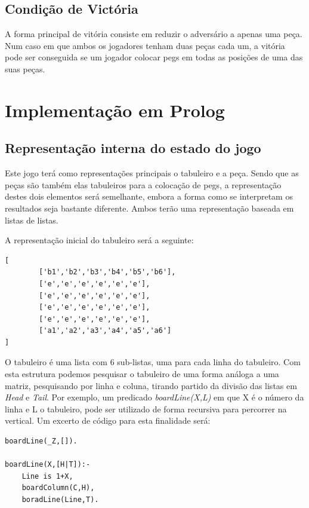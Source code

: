 \documentclass[paper=a4, fontsize=11pt]{scrartcl} %
\numberwithin{equation}{section} %
\numberwithin{figure}{section} %
\numberwithin{table}{section} %
\begin{document}
\subsection{Condição de Victória}

A forma principal de vitória consiste em reduzir o adversário a apenas uma peça. Num caso em que ambos os jogadores tenham duas peças cada um, a vitória pode ser conseguida se um jogador colocar pegs em todas as posições de uma das suas peças.



\section{Implementação em Prolog}

\subsection{Representação interna do estado do jogo}

Este jogo terá como representações principais o tabuleiro e a peça. Sendo que as peças são também elas tabuleiros para a colocação de pegs, a representação destes dois elementos será semelhante, embora a forma como se interpretam os resultados seja bastante diferente. Ambos terão uma representação baseada em listas de listas.

A representação inicial do tabuleiro será a seguinte:

\begin{lstlisting}
[
		['b1','b2','b3','b4','b5','b6'],
		['e','e','e','e','e','e'],
		['e','e','e','e','e','e'],
		['e','e','e','e','e','e'],
		['e','e','e','e','e','e'],
		['a1','a2','a3','a4','a5','a6']
]
\end{lstlisting}

O tabuleiro é uma lista com 6 sub-listas, uma para cada linha do tabuleiro. Com esta estrutura podemos pesquisar o tabuleiro de uma forma análoga a uma matriz, pesquisando por linha e coluna, tirando partido da divisão das listas em \emph{Head} e \emph{Tail}. Por exemplo, um predicado \emph{boardLine(X,L)} em que X é o número da linha e L o tabuleiro, pode ser utilizado de forma recursiva para percorrer na vertical. Um excerto de código para esta finalidade será:

\begin{lstlisting}
boardLine(_Z,[]).

boardLine(X,[H|T]):-
	Line is 1+X,
	boardColumn(C,H),
	boradLine(Line,T).
\end{lstlisting}
\end{document}
